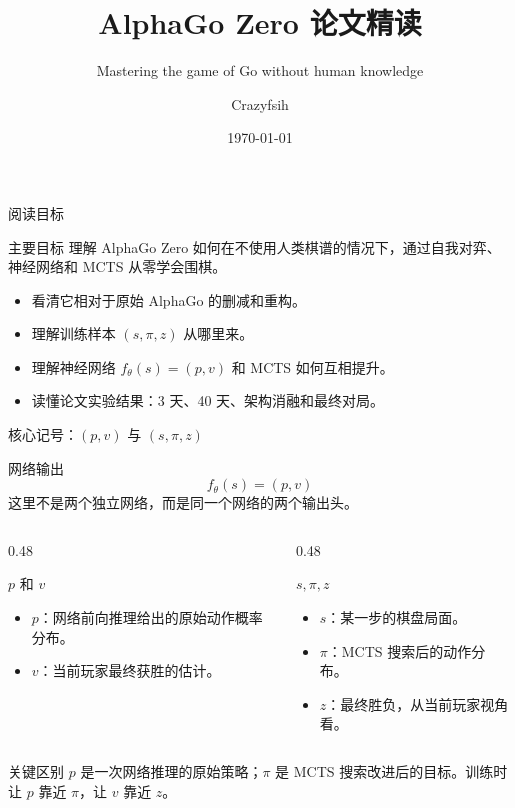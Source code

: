 \documentclass[UTF8,aspectratio=169,10pt]{ctexbeamer}
\title[AlphaGo Zero 论文精读]{AlphaGo Zero 论文精读}
\subtitle{Mastering the game of Go without human knowledge}
\author{Crazyfsih}
\date{\today}
\begin{document}
\begin{frame}
  \titlepage
\end{frame}

\begin{frame}{阅读目标}
  \begin{block}{主要目标}
    理解 AlphaGo Zero 如何在不使用人类棋谱的情况下，通过自我对弈、神经网络和 MCTS 从零学会围棋。
  \end{block}

  \begin{itemize}
    \item 看清它相对于原始 AlphaGo 的删减和重构。
    \item 理解训练样本 $(s,\pi,z)$ 从哪里来。
    \item 理解神经网络 $f_{\theta}(s)=(p,v)$ 和 MCTS 如何互相提升。
    \item 读懂论文实验结果：3 天、40 天、架构消融和最终对局。
  \end{itemize}
\end{frame}

\begin{frame}{核心记号：$(p,v)$ 与 $(s,\pi,z)$}
  \small
  \begin{block}{网络输出}
    \[
      f_{\theta}(s)=(p,v)
    \]
    这里不是两个独立网络，而是同一个网络的两个输出头。
  \end{block}

  \begin{columns}[T,onlytextwidth]
    \begin{column}{0.48\textwidth}
      \begin{block}{$p$ 和 $v$}
        \begin{itemize}
          \item $p$：网络前向推理给出的原始动作概率分布。
          \item $v$：当前玩家最终获胜的估计。
        \end{itemize}
      \end{block}
    \end{column}
    \begin{column}{0.48\textwidth}
      \begin{block}{$s,\pi,z$}
        \begin{itemize}
          \item $s$：某一步的棋盘局面。
          \item $\pi$：MCTS 搜索后的动作分布。
          \item $z$：最终胜负，从当前玩家视角看。
        \end{itemize}
      \end{block}
    \end{column}
  \end{columns}

  \begin{alertblock}{关键区别}
    $p$ 是一次网络推理的原始策略；$\pi$ 是 MCTS 搜索改进后的目标。训练时让 $p$ 靠近 $\pi$，让 $v$ 靠近 $z$。
  \end{alertblock}
\end{frame}
\end{document}
